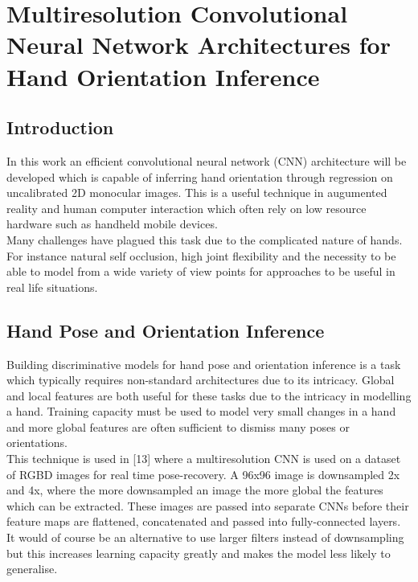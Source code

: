 \documentclass{article}
\begin{document}
\section*{Multiresolution Convolutional Neural Network Architectures for Hand Orientation Inference}

\subsection*{Introduction}
In this work an efficient convolutional neural network (CNN) architecture will be developed which is capable of inferring hand orientation through regression on uncalibrated 2D monocular images. This is a useful technique in augumented reality and human computer interaction which often rely on low resource hardware such as handheld mobile devices.\\

Many challenges have plagued this task due to the complicated nature of hands. For instance natural self occlusion, high joint flexibility and the necessity to be able to model from a wide variety of view points for approaches to be useful in real life situations. \\

\subsection*{Hand Pose and Orientation Inference}
Building discriminative models for hand pose and orientation inference is a task which typically requires non-standard architectures due to its intricacy. Global and local features are both useful for these tasks due to the intricacy in modelling a hand. Training capacity must be used to model very small changes in a hand and more global features are often sufficient to dismiss many poses or orientations.\\

This technique is used in [13] where a multiresolution CNN is used on a dataset of RGBD images for real time pose-recovery. A 96x96 image is downsampled 2x and 4x, where the more downsampled an image the more global the features which can be extracted. These images are passed into separate CNNs before their feature maps are flattened, concatenated and passed into fully-connected layers. It would of course be an alternative to use larger filters instead of downsampling but this increases learning capacity greatly and makes the model less likely to generalise.\\
\end{document}

